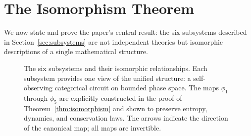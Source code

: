 \documentclass[twocolumn,10pt,a4paper]{article}
\theoremstyle{definition}
\theoremstyle{remark}
\begin{document}
\section{The Isomorphism Theorem}
\label{sec:isomorphism}

We now state and prove the paper's central result: the six subsystems described in Section~\ref{sec:subsystems} are not independent theories but isomorphic descriptions of a single mathematical structure.

\begin{figure}[t]
    \centering
    \caption{The six subsystems and their isomorphic relationships. Each subsystem provides one view of the unified structure: a self-observing categorical circuit on bounded phase space. The maps $\phi_1$ through $\phi_5$ are explicitly constructed in the proof of Theorem~\ref{thm:isomorphism} and shown to preserve entropy, dynamics, and conservation laws. The arrows indicate the direction of the canonical map; all maps are invertible.}
    \label{fig:hexagon}
\end{figure}
\end{document}
